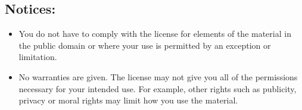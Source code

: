 \documentclass[letterpaper,twoside]{article}
\begin{document}
\subsection{Notices:}
\begin{itemize}
\item{You do not have to comply with the license for elements of the
  material in the public domain or where your use is permitted by an
  exception or limitation.}
\item{No warranties are given.  The license may not give you all of the
  permissions necessary for your intended use.  For example, other rights
  such as publicity, privacy or moral rights may limit how you use the
  material.}
\end{itemize}


\end{document}

